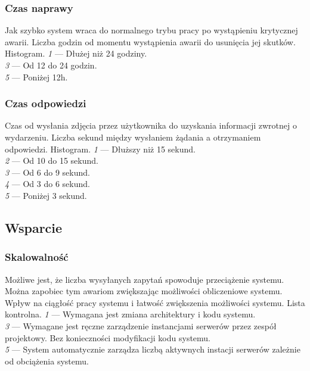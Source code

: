 \documentclass[10pt]{dokument-ppi}
\begin{document}
\subsubsection{Czas naprawy}
\begin{requirement}
    \desc%
        Jak szybko system wraca do normalnego trybu pracy po wystąpieniu
        krytycznej awarii.
    \metric%
        Liczba godzin od momentu wystąpienia awarii do usunięcia jej skutków.
    \tool%
        Histogram.
    \scale%
        \emph{1} --- Dłużej niż 24 godziny.\\
        \emph{3} --- Od 12 do 24 godzin.\\
        \emph{5} --- Poniżej 12h.
\end{requirement}

\subsubsection{Czas odpowiedzi}
\begin{requirement}
    \desc%
        Czas od wysłania zdjęcia przez użytkownika do uzyskania informacji
        zwrotnej o wydarzeniu.
    \metric%
        Liczba sekund między wysłaniem żądania a otrzymaniem odpowiedzi.
    \tool%
        Histogram.
    \scale%
        \emph{1} --- Dłuższy niż 15 sekund.\\
        \emph{2} --- Od 10 do 15 sekund.\\
        \emph{3} --- Od 6 do 9 sekund.\\
        \emph{4} --- Od 3 do 6 sekund.\\
        \emph{5} --- Poniżej 3 sekund.
\end{requirement}


\subsection{Wsparcie}

\subsubsection{Skalowalność}
\begin{requirement}
    \desc%
        Możliwe jest, że liczba wysyłanych zapytań spowoduje przeciążenie
        systemu. Można zapobiec tym awariom zwiększając możliwości obliczeniowe
        systemu.
    \metric%
        Wpływ na ciągłość pracy systemu i łatwość zwiększenia możliwości
        systemu.
    \tool%
        Lista kontrolna.
    \scale%
        \emph{1} --- Wymagana jest zmiana architektury i kodu systemu.\\
        \emph{3} --- Wymagane jest ręczne zarządzenie instancjami serwerów przez zespół projektowy. Bez konieczności modyfikacji kodu systemu.\\
        \emph{5} --- System automatycznie zarządza liczbą aktywnych instacji serwerów zależnie od obciążenia systemu.
\end{requirement}
\end{document}

